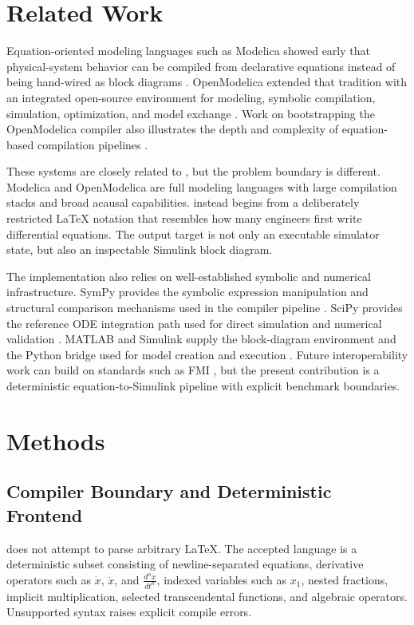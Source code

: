 \documentclass[colorlinks,upint,subscriptcorrection,varvw,balance,nofoot]{asmeconf}
\newcommand{\EqnToSim}{\NoCaseChange{Eqn2Sim}}
\begin{document}
\section{Related Work}
Equation-oriented modeling languages such as Modelica showed early that physical-system behavior can be compiled from declarative equations instead of being hand-wired as block diagrams \cite{fritzson1998modelica}. OpenModelica extended that tradition with an integrated open-source environment for modeling, symbolic compilation, simulation, optimization, and model exchange \cite{fritzson2020openmodelica}. Work on bootstrapping the OpenModelica compiler also illustrates the depth and complexity of equation-based compilation pipelines \cite{sjolund2014bootstrapping}.

These systems are closely related to \EqnToSim{}, but the problem boundary is different. Modelica and OpenModelica are full modeling languages with large compilation stacks and broad acausal capabilities. \EqnToSim{} instead begins from a deliberately restricted \LaTeX{} notation that resembles how many engineers first write differential equations. The output target is not only an executable simulator state, but also an inspectable Simulink block diagram.

The implementation also relies on well-established symbolic and numerical infrastructure. SymPy provides the symbolic expression manipulation and structural comparison mechanisms used in the compiler pipeline \cite{meurer2017sympy}. SciPy provides the reference ODE integration path used for direct simulation and numerical validation \cite{virtanen2020scipy}. MATLAB and Simulink supply the block-diagram environment and the Python bridge used for model creation and execution \cite{mathworks2025simulink,mathworks2025python}. Future interoperability work can build on standards such as FMI \cite{fmi302}, but the present contribution is a deterministic equation-to-Simulink pipeline with explicit benchmark boundaries.

\section{Methods}
\subsection{Compiler Boundary and Deterministic Frontend}
\EqnToSim{} does not attempt to parse arbitrary \LaTeX. The accepted language is a deterministic subset consisting of newline-separated equations, derivative operators such as $\dot{x}$, $\ddot{x}$, and $\frac{d^n x}{dt^n}$, indexed variables such as $x_1$, nested fractions, implicit multiplication, selected transcendental functions, and algebraic operators. Unsupported syntax raises explicit compile errors.
\end{document}

